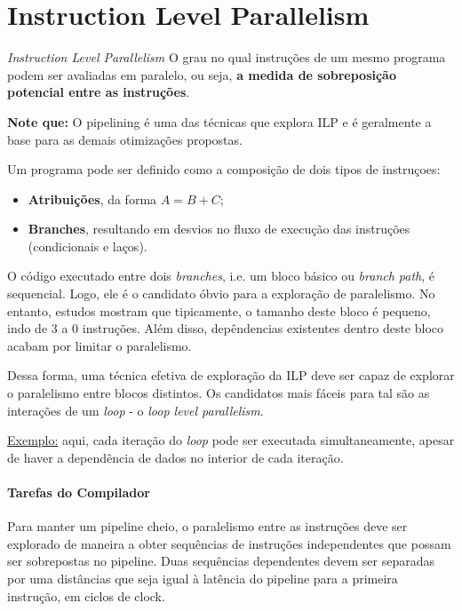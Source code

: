 \chapter{Instruction Level Parallelism}

\begin{definicao}{\textit{Instruction Level Parallelism}}
  O grau no qual instruções de um mesmo programa podem ser avaliadas em paralelo, ou seja, \textbf{a medida de sobreposição potencial entre as instruções}.
\end{definicao}

\textbf{Note que:} O pipelining é uma das técnicas que explora ILP e é geralmente a base para as demais otimizações propostas.

Um programa pode ser definido como a composição de dois tipos de instruçoes:
\begin{itemize}
  \item \textbf{Atribuições}, da forma $A = B + C$;

  \item \textbf{Branches}, resultando em desvios no fluxo de execução das instruções (condicionais e laços).
\end{itemize}

O código executado entre dois \textit{branches}, i.e. um bloco básico ou \textit{branch path}, é sequencial. Logo, ele é o candidato óbvio para a exploração de paralelismo. No entanto, estudos mostram que tipicamente, o tamanho deste bloco é pequeno, indo de 3 a 0 instruções. Além disso, depêndencias existentes dentro deste bloco acabam por limitar o paralelismo.

Dessa forma, uma técnica efetiva de exploração da ILP deve ser capaz de explorar o paralelismo entre blocos distintos. Os candidatos mais fáceis para tal são as interações de um \textit{loop} - o \textit{loop level parallelism}.

\underline{Exemplo:} aqui, cada iteração do \textit{loop} pode ser executada simultaneamente, apesar de haver a dependência de dados no interior de cada iteração.

\subsubsection{Tarefas do Compilador}
Para manter um pipeline cheio, o paralelismo entre as instruções deve ser explorado de maneira a obter sequências de instruções independentes que possam ser sobrepostas no pipeline. Duas sequências dependentes devem ser separadas por uma distâncias que seja igual à latência do pipeline para a primeira instrução, em ciclos de clock.

